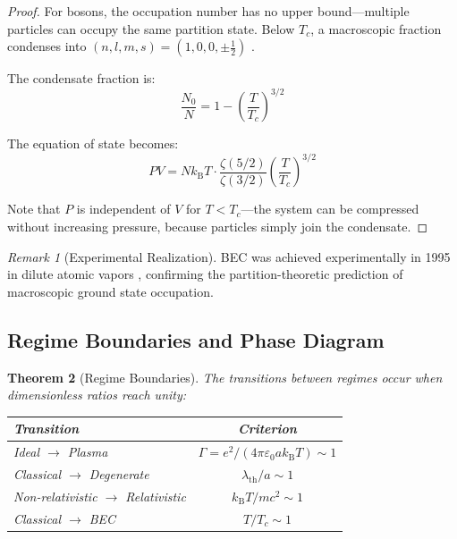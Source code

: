 \documentclass[twocolumn,10pt,a4paper]{article}
\newtheorem{theorem}{Theorem}[section]
\theoremstyle{definition}
\theoremstyle{remark}
\newtheorem{remark}[theorem]{Remark}
\newcommand{\kB}{k_{\mathrm{B}}}
\begin{document}
\begin{proof}
For bosons, the occupation number has no upper bound---multiple particles can occupy the same partition state. Below $T_c$, a macroscopic fraction condenses into $(n, l, m, s) = (1, 0, 0, \pm\frac{1}{2})$ \cite{einstein1925,bose1924}.

The condensate fraction is:
\begin{equation}
    \frac{N_0}{N} = 1 - \left(\frac{T}{T_c}\right)^{3/2}
\end{equation}

The equation of state becomes:
\begin{equation}
    PV = N\kB T \cdot \frac{\zeta(5/2)}{\zeta(3/2)}\left(\frac{T}{T_c}\right)^{3/2}
\end{equation}

Note that $P$ is independent of $V$ for $T < T_c$---the system can be compressed without increasing pressure, because particles simply join the condensate.
\end{proof}

\begin{remark}[Experimental Realization]
BEC was achieved experimentally in 1995 in dilute atomic vapors \cite{anderson1995,davis1995}, confirming the partition-theoretic prediction of macroscopic ground state occupation.
\end{remark}

\subsection{Regime Boundaries and Phase Diagram}

\begin{theorem}[Regime Boundaries]
The transitions between regimes occur when dimensionless ratios reach unity:
\begin{center}
\begin{tabular}{lc}
\toprule
Transition & Criterion \\
\midrule
Ideal $\to$ Plasma & $\Gamma = e^2/(4\pi\varepsilon_0 a\kB T) \sim 1$ \\
Classical $\to$ Degenerate & $\lambda_{\text{th}}/a \sim 1$ \\
Non-relativistic $\to$ Relativistic & $\kB T/mc^2 \sim 1$ \\
Classical $\to$ BEC & $T/T_c \sim 1$ \\
\bottomrule
\end{tabular}
\end{center}
\end{theorem}
\end{document}
